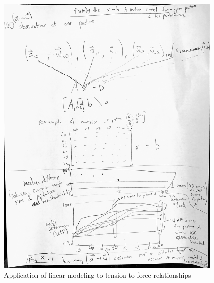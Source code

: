 \documentclass[utf8]{frontiersSCNS} %
\begin{document}
\begin{figure}[h!]
\begin{center}
\includegraphics[width=15cm]{figures/creating_A_matrix/creating_A_matrix.jpg}%
\end{center}
\caption{Application of linear modeling to tension-to-force relationships }
\label{fig:creating_A_matrix}
\end{figure}
\end{document}
